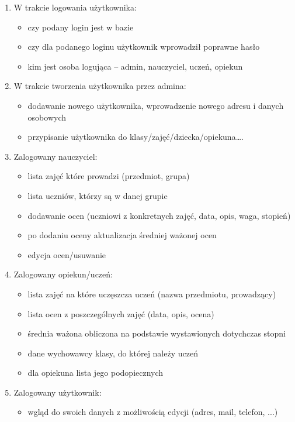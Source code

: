 \documentclass[12pt, titlepage]{article}
\begin{document}
\begin{enumerate}
	\item W trakcie logowania użytkownika:
	\begin{itemize}
		\item czy podany login jest w bazie
		\item czy dla podanego loginu użytkownik wprowadził poprawne hasło
		\item kim jest osoba logująca – admin, nauczyciel, uczeń, opiekun
	\end{itemize}	
	\item W trakcie tworzenia użytkownika przez admina:
	\begin{itemize}
		\item dodawanie nowego użytkownika, wprowadzenie nowego adresu i danych osobowych
		\item przypisanie użytkownika do klasy/zajęć/dziecka/opiekuna….
	\end{itemize}	
	\item Zalogowany nauczyciel:
	\begin{itemize}
		\item lista zajęć które prowadzi (przedmiot, grupa)
		\item lista uczniów, którzy są w danej grupie
		\item dodawanie ocen (uczniowi z konkretnych zajęć, data, opis, waga, stopień)
		\item po dodaniu oceny aktualizacja średniej ważonej ocen
		\item edycja ocen/usuwanie
	\end{itemize}	
	\item Zalogowany opiekun/uczeń:
	\begin{itemize}
		\item lista zajęć na które uczęszcza uczeń (nazwa przedmiotu, prowadzący)
		\item lista ocen z poszczególnych zajęć (data, opis, ocena)
		\item średnia ważona obliczona na podstawie wystawionych dotychczas stopni
		\item dane wychowawcy klasy, do której należy uczeń
		\item dla opiekuna lista jego podopiecznych
	\end{itemize}	
	\item Zalogowany użytkownik:
	\begin{itemize}
		\item wgląd do swoich danych z możliwością edycji (adres, mail, telefon, ...)
	\end{itemize}	
\end{enumerate}
\end{document}
